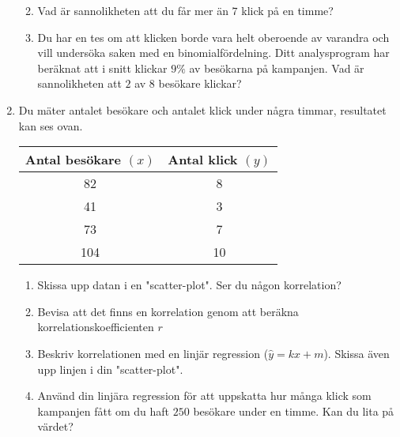 \documentclass[a4paper,10pt]{article}
\begin{document}
\begin{enumerate}
\begin{enumerate}
      \vspace{10cm}
      \item{Vad är sannolikheten att du får mer än $7$ klick på en timme?}
      \newpage
      \item{Du har en tes om att klicken borde vara helt oberoende av varandra och vill undersöka saken med en binomialfördelning. Ditt analysprogram har beräknat att i snitt klickar $9\%$ av besökarna på kampanjen. Vad är sannolikheten att $2$ av $8$ besökare klickar?}
    \end{enumerate}
\newpage
    \item{Du mäter antalet besökare och antalet klick under några timmar, resultatet kan ses ovan.
    \begin{table}
        \centering
        \begin{tabular}[H]{c|c}
        \textbf{Antal besökare $(x)$}  & \textbf{Antal klick $(y)$}\\ \hline
                82                   & 8                           \\
                41                   & 3                           \\
                73                   & 7                           \\
                104                  & 10
        \end{tabular}
    \end{table}
  }
    \begin{enumerate}
        \item{Skissa upp datan i en "scatter-plot". Ser du någon korrelation?}
        \newpage
        \item{Bevisa att det finns en korrelation genom att beräkna korrelationskoefficienten $r$}
        \newpage
        \item{Beskriv korrelationen med en linjär regression ($\hat{y}=kx+m$). Skissa även upp linjen i din "scatter-plot".}
        \newpage
        \item{Använd din linjära regression för att uppskatta hur många klick som kampanjen fått om du haft $250$ besökare under en timme. Kan du lita på värdet?}
    \end{enumerate}
\end{enumerate}
\end{document}
